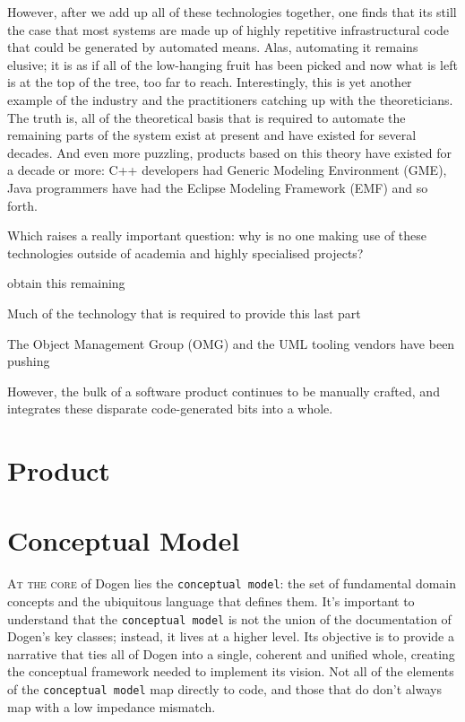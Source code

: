 \documentclass{book}
\begin{document}
However, after we add up all of these technologies together, one finds
that its still the case that most systems are made up of highly
repetitive infrastructural code that could be generated by automated
means. Alas, automating it remains elusive; it is as if all of the
low-hanging fruit has been picked and now what is left is at the top
of the tree, too far to reach. Interestingly, this is yet another
example of the industry and the practitioners catching up with the
theoreticians. The truth is, all of the theoretical basis that is
required to automate the remaining parts of the system exist at
present and have existed for several decades. And even more puzzling,
products based on this theory have existed for a decade or more: C++
developers had Generic Modeling Environment (GME), Java programmers
have had the Eclipse Modeling Framework (EMF) and so forth.

Which raises a really important question: why is no one making use of
these technologies outside of academia and highly specialised
projects?



obtain
this remaining




Much of the technology that is
required to provide this last part



The Object Management Group (OMG)
and the UML tooling vendors have been pushing




However, the bulk of a software product
continues to be manually crafted, and integrates these disparate
code-generated bits into a whole.




\chapter{Product}



\chapter{Conceptual Model}

\lettrine{A}{t the core} of Dogen lies the \texttt{conceptual model}:
the set of fundamental domain concepts and the ubiquitous language
that defines them. It's important to understand that the
\texttt{conceptual model} is not the union of the documentation of
Dogen's key classes; instead, it lives at a higher level. Its
objective is to provide a narrative that ties all of Dogen into a
single, coherent and unified whole, creating the conceptual framework
needed to implement its vision. Not all of the elements of the
\texttt{conceptual model} map directly to code, and those that do
don't always map with a low impedance mismatch.
\end{document}
